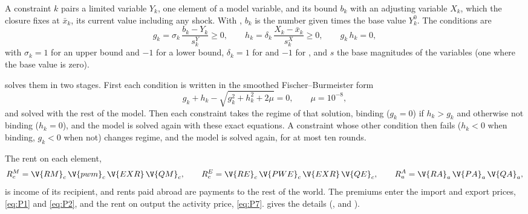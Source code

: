 
A constraint $k$ pairs a limited variable $Y_k$, one element of a model
variable, and its bound $b_k$ with an adjusting variable $X_k$, which the
closure fixes at $\bar{x}_k$, its current value including any shock. With
, $b_k$ is the number given times the base value $Y^0_k$. The
conditions are
\begin{equation*}
g_k = \sigma_k\,\frac{b_k - Y_k}{s^Y_k} \ge 0, \qquad
h_k = \delta_k\,\frac{X_k - \bar{x}_k}{s^X_k} \ge 0, \qquad
g_k\,h_k = 0,
\end{equation*}
with $\sigma_k = 1$ for an upper bound and $-1$ for a lower bound,
$\delta_k = 1$ for  and $-1$ for , and $s$ the base
magnitudes of the variables (one where the base value is zero).

 solves them in two stages. First each condition is written
in the smoothed Fischer--Burmeister form
\begin{equation*}
g_k + h_k - \sqrt{g_k^2 + h_k^2 + 2\mu} = 0, \qquad \mu = 10^{-8},
\end{equation*}
and solved with the rest of the model. Then each constraint takes the regime
of that solution, binding ($g_k = 0$) if $h_k > g_k$ and otherwise not binding
($h_k = 0$), and the model is solved again with these exact equations. A
constraint whose other condition then fails ($h_k < 0$ when binding,
$g_k < 0$ when not) changes regime, and the model is solved again, for at most
ten rounds.

The rent on each element,
\begin{equation*}
R^M_c = \V{RM}_c\,\V{pwm}_c\,\V{EXR}\,\V{QM}_c, \qquad
R^E_c = \V{RE}_c\,\V{PWE}_c\,\V{EXR}\,\V{QE}_c, \qquad
R^A_a = \V{RA}_a\,\V{PA}_a\,\V{QA}_a,
\end{equation*}
is income of its recipient, and rents paid abroad are payments to the rest of
the world. The premiums enter the import and export prices, \eqref{eq:P1} and
\eqref{eq:P2}, and the rent on output the activity price, \eqref{eq:P7}.
 gives the details (,
 and ).


\begin{alsosee}
\end{alsosee}
